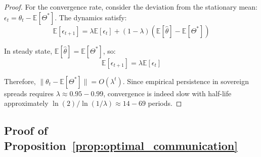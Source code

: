 \documentclass[12pt]{article}
\theoremstyle{plain}
\begin{document}
\begin{proof}
	For the convergence rate, consider the deviation from the stationary mean:
	$\epsilon_t = \theta_t - \mathbb{E}[\Theta^*]$. The dynamics satisfy:
	\begin{equation}
		\mathbb{E}[\epsilon_{t+1}] = \lambda \mathbb{E}[\epsilon_t] + (1-\lambda)(\mathbb{E}[\hat{\theta}] - \mathbb{E}[\Theta^*]) \label{eq:error_dynamics}
	\end{equation}

	In steady state, $\mathbb{E}[\hat{\theta}] = \mathbb{E}[\Theta^*]$, so:
	\begin{equation}
		\mathbb{E}[\epsilon_{t+1}] = \lambda \mathbb{E}[\epsilon_t] \label{eq:convergence_rate}
	\end{equation}

	Therefore, $\|\theta_t - \mathbb{E}[\Theta^*]\| = O(\lambda^t)$. Since
	empirical persistence in sovereign spreads requires $\lambda \approx
		0.95-0.99$, convergence is indeed slow with half-life approximately
	$\ln(2)/\ln(1/\lambda) \approx 14-69$ periods.
\end{proof}

\subsection{Proof of Proposition~\ref{prop:optimal_communication}}\label{app:proof_optimal_communication}
\end{document}
